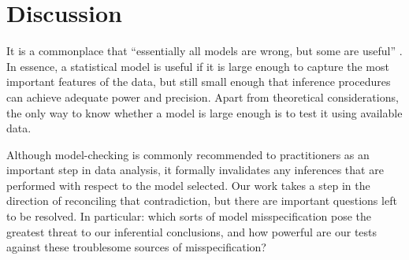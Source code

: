 \documentclass{article}
\begin{document}

\section{Discussion}
\label{sec:discussion}

It is a commonplace that ``essentially all models are wrong, but some are useful'' \citep{box1987empirical}. In essence, a statistical model is useful if it is large enough to capture the most important features of the data, but still small enough that inference procedures can achieve adequate power and precision. Apart from theoretical considerations, the only way to know whether a model is large enough is to test it using available data.

Although model-checking is commonly recommended to practitioners as an important step in data analysis, it formally invalidates any inferences that are performed with respect to the model selected. Our work takes a step in the direction of reconciling that contradiction, but there are important questions left to be resolved. In particular: which sorts of model misspecification pose the greatest threat to our inferential conclusions, and how powerful are our tests against these troublesome sources of misspecification? 
\end{document}
